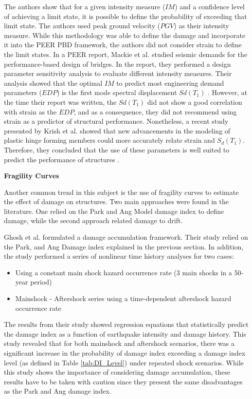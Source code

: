 The authors show that for a given intensity measure ($IM$) and a confidence level of achieving a limit state, it is possible to define the probability of exceeding that limit state. The authors used peak ground velocity ($PGV$) as their intensity measure. While this methodology was able to define the damage and incorporate it into the PEER PBD framework, the authors did not consider strain to define the limit states. In a PEER report, Mackie et al. studied seismic demands for the performance-based design of bridges. In the report, they performed a design parameter sensitivity analysis to evaluate different intensity measures. Their analysis showed that the optimal $IM$ to predict most engineering demand parameters ($EDP$) is the first mode spectral displacement $Sd(T_{1})$  \cite{Mackie2003}. However, at the time their report was written, the $Sd(T_{1})$ did not show a good correlation with strain as the $EDP$, and as a consequence, they did not recommend using strain as a predictor of structural performance. Nonetheless, a recent study presented by Krish et al. showed that new advancements in the modeling of plastic hinge forming members could more accurately relate strain and $S_{d}(T_{1})$. Therefore, they concluded that the use of these parameters is well suited to predict the performance of structures \cite{Krish2018}.

\textbf{Fragility Curves}

Another common trend in this subject is the use of fragility curves to estimate the effect of damage on structures. Two main approaches were found in the literature. One relied on the Park and Ang Model damage index to define damage, while the second approach related damage to drift.

Ghosh et al. \cite{Ghosh2015} formulated a damage accumulation framework. Their study relied on the Park, and Ang Damage index explained in the previous section. In addition, the study performed a series of nonlinear time history analyses for two cases:

\begin{itemize}
	\item Using a constant main shock hazard occurrence rate (3 main shocks in a 50-year period)
	\item Mainshock - Aftershock series using a time-dependent aftershock hazard occurrence rate
\end{itemize}

The results from their study showed regression equations that statistically predict the damage index as a function of earthquake intensity and damage history. This study revealed that for both mainshock and aftershock scenarios, there was a significant increase in the probability of damage index exceeding a damage index level (as defined in Table \ref{tab:DI_Level}) under repeated shock scenarios. While this study shows the importance of considering damage accumulation, these results have to be taken with caution since they present the same disadvantages as the Park and Ang damage index.

